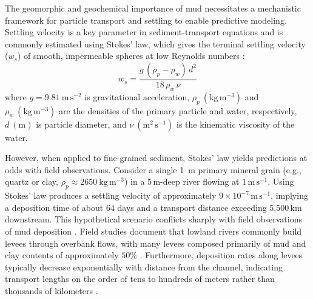 \documentclass{agujournal2019}
\begin{document}
The geomorphic and geochemical importance of mud necessitates a mechanistic framework for particle transport and settling to enable predictive modeling. Settling velocity is a key parameter in sediment-transport equations and is commonly estimated using Stokes' law, which gives the terminal settling velocity ($w_s$) of smooth, impermeable spheres at low Reynolds numbers \cite{bird2006transport, stokes1851effect}:
\begin{equation}
w_s = \frac{g\,(\rho_p - \rho_w)\,d^2}{18\,\rho_w\,\nu}
    \label{eq:stokes}
\end{equation}
where $g = 9.81\ \mathrm{m\,s^{-2}}$ is gravitational acceleration, $\rho_p\ (\mathrm{kg\,m^{-3}})$ and $\rho_w\ (\mathrm{kg\,m^{-3}})$ are the densities of the primary particle and water, respectively, $d\ (\mathrm{m})$ is particle diameter, and $\nu\ (\mathrm{m^2\,s^{-1}})$ is the kinematic viscosity of the water.

However, when applied to fine-grained sediment, Stokes' law yields predictions at odds with field observations. Consider a single 1~\textmu m primary mineral grain (e.g., quartz or clay, $\rho_p \approx 2650\ \mathrm{kg\,m^{-3}}$) in a $5$\,m-deep river flowing at $1\,\mathrm{m\,s}^{-1}$. Using Stokes' law produces a settling velocity of approximately $9\times 10^{-7}\,\mathrm{m\,s}^{-1}$, implying a deposition time of about 64 days and a transport distance exceeding 5,500\,km downstream. This hypothetical scenario conflicts sharply with field observations of mud deposition \cite{lamb2020mud, mason2019differential, nicholas1996significance}. Field studies document that lowland rivers commonly build levees through overbank flows, with many levees composed primarily of mud and clay contents of approximately $50\%$ \cite{aalto2008spatial}. Furthermore, deposition rates along levees typically decrease exponentially with distance from the channel, indicating transport lengths on the order of tens to hundreds of meters rather than thousands of kilometers \cite{hajek2012simplified}.
\end{document}
